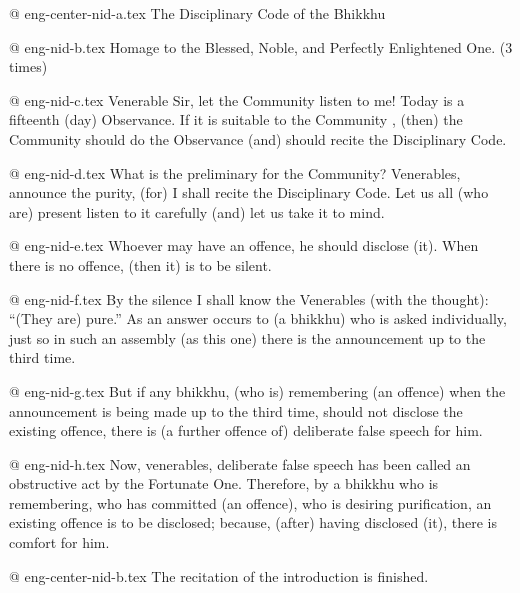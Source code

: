 @ eng-center-nid-a.tex
The Disciplinary Code of the Bhikkhu

@ eng-nid-b.tex
Homage to the Blessed, Noble, and Perfectly Enlightened One.
(3 times)

@ eng-nid-c.tex
Venerable Sir, let the Community listen to me! Today is a fifteenth (day) Observance. If it is suitable to the Community , (then) the Community should do the Observance (and) should recite the Disciplinary Code.

@ eng-nid-d.tex
What is the preliminary for the Community? Venerables, announce the purity, (for) I shall recite the Disciplinary Code. Let us all (who are) present listen to it carefully (and) let us take it to mind.

@ eng-nid-e.tex
Whoever may have an offence, he should disclose (it). When there is no offence, (then it) is to be silent.

@ eng-nid-f.tex
By the silence I shall know the Venerables (with the thought): “(They are) pure.” As an answer occurs to (a bhikkhu) who is asked individually, just so in such an assembly (as this one) there is the announcement up to the third time. 

@ eng-nid-g.tex
But if any bhikkhu, (who is) remembering (an offence) when the announcement is being made up to the third time, should not disclose the existing offence, there is (a further offence of) deliberate false speech for him.

@ eng-nid-h.tex
Now, venerables, deliberate false speech has been called an obstructive act by the Fortunate One. Therefore, by a bhikkhu who is remembering, who has committed (an offence), who is desiring purification, an existing offence is to be disclosed; because, (after) having disclosed (it), there is comfort for him.

@ eng-center-nid-b.tex
The recitation of the introduction is finished.
